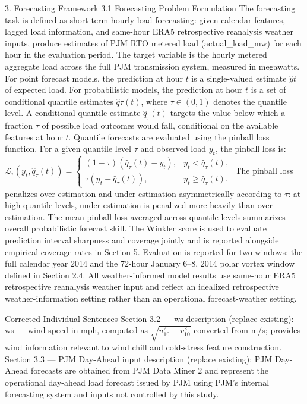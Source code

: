 3. Forecasting Framework
3.1 Forecasting Problem Formulation
The forecasting task is defined as short-term hourly load forecasting: given calendar features, lagged load information, and same-hour ERA5 retrospective reanalysis weather inputs, produce estimates of PJM RTO metered load (actual_load_mw) for each hour in the evaluation period. The target variable is the hourly metered aggregate load across the full PJM transmission system, measured in megawatts.
For point forecast models, the prediction at hour $t$ is a single-valued estimate $\hat{y}t$ of expected load. For probabilistic models, the prediction at hour $t$ is a set of conditional quantile estimates $\hat{q}{\tau}(t)$, where $\tau \in (0,1)$ denotes the quantile level. A conditional quantile estimate $\hat{q}_{\tau}(t)$ targets the value below which a fraction $\tau$ of possible load outcomes would fall, conditional on the available features at hour $t$.
Quantile forecasts are evaluated using the pinball loss function. For a given quantile level $\tau$ and observed load $y_t$, the pinball loss is:
$\mathcal{L}_{\tau}(y_t, \hat{q}_{\tau}(t)) = \begin{cases} (1 - \tau)\left(\hat{q}_{\tau}(t) - y_t\right), & y_t < \hat{q}_{\tau}(t), \\ \tau\left(y_t - \hat{q}_{\tau}(t)\right), & y_t \geq \hat{q}_{\tau}(t). \end{cases}$
The pinball loss penalizes over-estimation and under-estimation asymmetrically according to $\tau$: at high quantile levels, under-estimation is penalized more heavily than over-estimation. The mean pinball loss averaged across quantile levels summarizes overall probabilistic forecast skill. The Winkler score is used to evaluate prediction interval sharpness and coverage jointly and is reported alongside empirical coverage rates in Section 5.
Evaluation is reported for two windows: the full calendar year 2014 and the 72-hour January 6–8, 2014 polar vortex window defined in Section 2.4. All weather-informed model results use same-hour ERA5 retrospective reanalysis weather input and reflect an idealized retrospective weather-information setting rather than an operational forecast-weather setting.

Corrected Individual Sentences
Section 3.2 — ws description (replace existing):
ws — wind speed in mph, computed as $\sqrt{u_{10}^2 + v_{10}^2}$ converted from m/s; provides wind information relevant to wind chill and cold-stress feature construction.
Section 3.3 — PJM Day-Ahead input description (replace existing):
PJM Day-Ahead forecasts are obtained from PJM Data Miner 2 and represent the operational day-ahead load forecast issued by PJM using PJM's internal forecasting system and inputs not controlled by this study.

